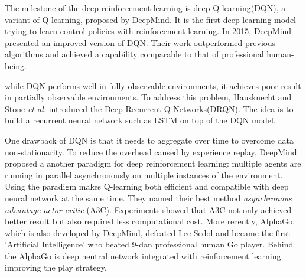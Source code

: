 
The milestone of the deep reinforcement learning is deep Q-learning(DQN)\cite{mnih2013playing}, a variant of Q-learning, proposed by DeepMind. It is the first deep learning model trying to learn control policies with reinforcement learning. In 2015, DeepMind presented an improved version of DQN\cite{mnih2015human}. Their work outperformed previous algorithms and achieved a capability comparable to that of professional human-being.
%

while DQN performs well in fully-observable environments, it achieves poor result in partially observable environments. To address this problem, Hausknecht and Stone\textit{ et al.} \cite{hausknecht2015deep} introduced the Deep Recurrent Q-Networks(DRQN). The idea is to build a recurrent neural network such as LSTM on top of the DQN model.
%

One drawback of DQN is that it needs to aggregate over time to overcome data non-stationarity. To reduce the overhead caused by experience replay, DeepMind \cite{mnih2016asynchronous} proposed a another paradigm for deep reinforcement learning: multiple agents are running in parallel asynchronously on multiple instances of the environment. Using the paradigm makes Q-learning both efficient and compatible with deep neural network at the same time. They named their best method \textit{asynchronous advantage actor-critic} (A3C). Experiments showed that A3C not only achieved better result but also required less computational cost.
%
More recently, AlphaGo\cite{brockman2016openai}, which is also developed by DeepMind, defeated Lee Sedol and became the first 'Artificial Intelligence' who beated 9-dan professional human Go player. Behind the AlphaGo is deep neutral network integrated with reinforcement learning improving the play strategy.
%
